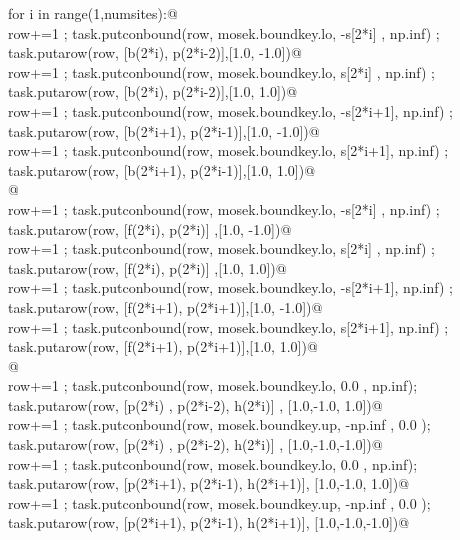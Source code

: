 \documentclass[11.5pt]{report}
\begin{document}
\begin{flushleft}
\begin{list}{}{}
\mbox{}\verb@            for  i in range(1,numsites):@\\
\mbox{}\verb@                row+=1 ;  task.putconbound(row, mosek.boundkey.lo, -s[2*i]  , np.inf) ; task.putarow(row, [b(2*i),   p(2*i-2)],[1.0, -1.0])@\\
\mbox{}\verb@                row+=1 ;  task.putconbound(row, mosek.boundkey.lo,  s[2*i]  , np.inf) ; task.putarow(row, [b(2*i),   p(2*i-2)],[1.0,  1.0])@\\
\mbox{}\verb@                row+=1 ;  task.putconbound(row, mosek.boundkey.lo, -s[2*i+1], np.inf) ; task.putarow(row, [b(2*i+1), p(2*i-1)],[1.0, -1.0])@\\
\mbox{}\verb@                row+=1 ;  task.putconbound(row, mosek.boundkey.lo,  s[2*i+1], np.inf) ; task.putarow(row, [b(2*i+1), p(2*i-1)],[1.0,  1.0])@\\
\mbox{}\verb@                @\\
\mbox{}\verb@                row+=1 ;  task.putconbound(row, mosek.boundkey.lo, -s[2*i]  , np.inf) ; task.putarow(row, [f(2*i),    p(2*i)]  ,[1.0, -1.0])@\\
\mbox{}\verb@                row+=1 ;  task.putconbound(row, mosek.boundkey.lo,  s[2*i]  , np.inf) ; task.putarow(row, [f(2*i),    p(2*i)]  ,[1.0,  1.0])@\\
\mbox{}\verb@                row+=1 ;  task.putconbound(row, mosek.boundkey.lo, -s[2*i+1], np.inf) ; task.putarow(row, [f(2*i+1),  p(2*i+1)],[1.0, -1.0])@\\
\mbox{}\verb@                row+=1 ;  task.putconbound(row, mosek.boundkey.lo,  s[2*i+1], np.inf) ; task.putarow(row, [f(2*i+1),  p(2*i+1)],[1.0,  1.0])@\\
\mbox{}\verb@                @\\
\mbox{}\verb@                row+=1 ;  task.putconbound(row, mosek.boundkey.lo, 0.0     , np.inf); task.putarow(row, [p(2*i)  , p(2*i-2), h(2*i)]  , [1.0,-1.0, 1.0])@\\
\mbox{}\verb@                row+=1 ;  task.putconbound(row, mosek.boundkey.up, -np.inf , 0.0   ); task.putarow(row, [p(2*i)  , p(2*i-2), h(2*i)]  , [1.0,-1.0,-1.0])@\\
\mbox{}\verb@                row+=1 ;  task.putconbound(row, mosek.boundkey.lo, 0.0     , np.inf); task.putarow(row, [p(2*i+1), p(2*i-1), h(2*i+1)], [1.0,-1.0, 1.0])@\\
\mbox{}\verb@                row+=1 ;  task.putconbound(row, mosek.boundkey.up, -np.inf , 0.0   ); task.putarow(row, [p(2*i+1), p(2*i-1), h(2*i+1)], [1.0,-1.0,-1.0])@\\

\end{list}
\end{flushleft}
\end{document}
